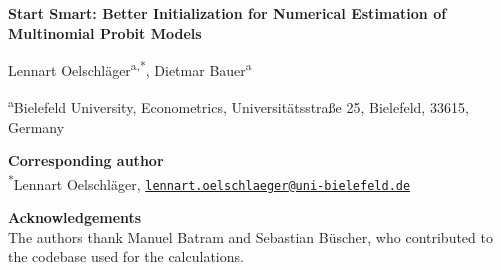 \documentclass[12pt]{article}
\begin{document}
\begin{center}
{\Large\bfseries Start Smart: Better Initialization for Numerical Estimation of Multinomial Probit Models\par}
\vspace{1.5em}
{\large Lennart Oelschläger\textsuperscript{a,}\textsuperscript{*}, Dietmar Bauer\textsuperscript{a}\par}
\vspace{1em}
\textsuperscript{a}Bielefeld University, Econometrics, Universitätsstraße 25, Bielefeld, 33615, Germany
\end{center}

\vspace{1.5em}

\textbf{Corresponding author}\\
\textsuperscript{*}Lennart Oelschläger, \href{mailto:lennart.oelschlaeger@uni-bielefeld.de}{\texttt{lennart.oelschlaeger@uni-bielefeld.de}}

\textbf{Acknowledgements}\\
The authors thank Manuel Batram and Sebastian Büscher, who contributed to the codebase used for the calculations.
\end{document}
